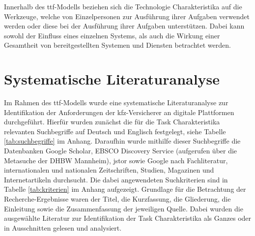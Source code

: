 Innerhalb des \acs{ttf}-Modells beziehen sich die Technologie Charakteristika auf die Werkzeuge, welche von Einzelpersonen zur Ausführung ihrer Aufgaben verwendet werden oder diese bei der Ausführung ihrer Aufgaben unterstützen.\autocite[Vgl.][S. 399]{SPIES2020} Dabei kann sowohl der Einfluss eines einzelnen Systems, als auch die Wirkung einer Gesamtheit von bereitgestellten Systemen und Diensten betrachtet werden. \autocite[Vgl.][S. 216]{GOODHUE1995}





\section{Systematische Literaturanalyse}


Im Rahmen des \acs{ttf}-Modells wurde eine systematische Literaturanalyse zur Identifikation der Anforderungen der \ac{kfz}-Versicherer an digitale Plattformen durchgeführt. Hierfür wurden zunächst die für die Task Charakteristika relevanten Suchbegriffe auf Deutsch und Englisch festgelegt, siehe Tabelle \ref{tab:suchbegriffe} im Anhang. Daraufhin wurde mithilfe dieser Suchbegriffe die Datenbanken Google Scholar, EBSCO Discovery Service (aufgerufen über die Metasuche der DHBW Mannheim), \ac{jstor} sowie Google nach Fachliteratur, internationalen und nationalen Zeitschriften, Studien, Magazinen und Internetartikeln durchsucht. Die dabei angewendeten Suchkriterien sind in Tabelle \ref{tab:kriterien} im Anhang aufgezeigt. Grundlage für die Betrachtung der Recherche-Ergebnisse waren der Titel, die Kurzfassung, die Gliederung, die Einleitung sowie die Zusammenfassung der jeweiligen Quelle. Dabei wurden die ausgewählte Literatur zur Identifikation der Task Charakteristika als Ganzes oder in Ausschnitten gelesen und analysiert. \autocite[Vgl.][]{SOLIS2021}





